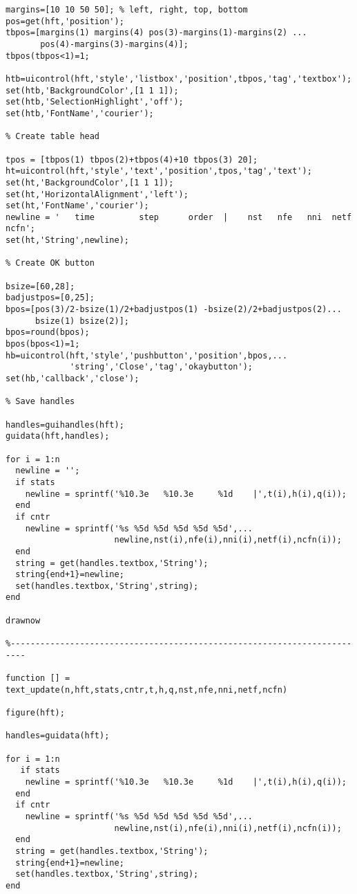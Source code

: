 \begin{lstlisting}[linerange={1-1,45-797}]
margins=[10 10 50 50]; % left, right, top, bottom
pos=get(hft,'position');
tbpos=[margins(1) margins(4) pos(3)-margins(1)-margins(2) ...
       pos(4)-margins(3)-margins(4)];
tbpos(tbpos<1)=1;

htb=uicontrol(hft,'style','listbox','position',tbpos,'tag','textbox');
set(htb,'BackgroundColor',[1 1 1]);
set(htb,'SelectionHighlight','off');
set(htb,'FontName','courier');

% Create table head

tpos = [tbpos(1) tbpos(2)+tbpos(4)+10 tbpos(3) 20];
ht=uicontrol(hft,'style','text','position',tpos,'tag','text');
set(ht,'BackgroundColor',[1 1 1]);
set(ht,'HorizontalAlignment','left');
set(ht,'FontName','courier');
newline = '   time         step      order  |    nst   nfe   nni  netf  ncfn';
set(ht,'String',newline);

% Create OK button
  
bsize=[60,28];
badjustpos=[0,25];
bpos=[pos(3)/2-bsize(1)/2+badjustpos(1) -bsize(2)/2+badjustpos(2)...
      bsize(1) bsize(2)];
bpos=round(bpos);
bpos(bpos<1)=1;
hb=uicontrol(hft,'style','pushbutton','position',bpos,...
             'string','Close','tag','okaybutton');
set(hb,'callback','close');

% Save handles

handles=guihandles(hft);
guidata(hft,handles);

for i = 1:n
  newline = '';
  if stats
    newline = sprintf('%10.3e   %10.3e     %1d    |',t(i),h(i),q(i));
  end
  if cntr
    newline = sprintf('%s %5d %5d %5d %5d %5d',...
                      newline,nst(i),nfe(i),nni(i),netf(i),ncfn(i));
  end
  string = get(handles.textbox,'String');
  string{end+1}=newline;
  set(handles.textbox,'String',string);
end

drawnow

%-------------------------------------------------------------------------

function [] = text_update(n,hft,stats,cntr,t,h,q,nst,nfe,nni,netf,ncfn)

figure(hft);

handles=guidata(hft);

for i = 1:n
   if stats
    newline = sprintf('%10.3e   %10.3e     %1d    |',t(i),h(i),q(i));
  end
  if cntr
    newline = sprintf('%s %5d %5d %5d %5d %5d',...
                      newline,nst(i),nfe(i),nni(i),netf(i),ncfn(i));
  end
  string = get(handles.textbox,'String');
  string{end+1}=newline;
  set(handles.textbox,'String',string);
end


\end{lstlisting}
